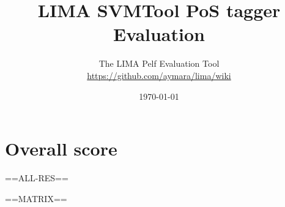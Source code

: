 \documentclass[10pt,a4paper]{article}
\title{LIMA SVMTool PoS tagger Evaluation}
\author{The LIMA Pelf Evaluation Tool\\
  \url{https://github.com/aymara/lima/wiki}}
\date{\today}
\begin{document}
\maketitle

\section{Overall score}

==ALL-RES==


==MATRIX==
\end{document}
